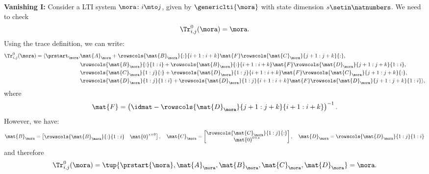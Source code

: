 {\begin{example}
\begin{equation*}
    \end{equation*}
    \textbf{Vanishing I:}
    Consider a LTI system $\mora\colon i\mto j$, given by $\genericlti{\mora}$ with state dimension $s\setin \natnumbers$.
    We need to check
    \begin{equation*}
        \Tr_{i,j}^0 (\mora)=\mora.
    \end{equation*}
    Using the trace definition, we can write:
    \begin{equation*}
        \begin{aligned}
            \Tr_{i,j}^0 (\mora)=\langle\prstart_{\mora}, & \mat{A}_\mora+\rowscols{\mat{B}_{\mora}}{:}{i+1:i+k}\mat{F}\rowscols{\mat{C}_{\mora}}{j+1:j+k}{:}, \\
                                                         & \rowscols{\mat{B}_{\mora}}{:}{1:i}+ \rowscols{\mat{B}_{\mora}}{:}{i+1:i+k}\mat{F}\rowscols{\mat{D}_{\mora}}{j+1:j+k}{1:i}, \\
                                                         & \rowscols{\mat{C}_{\mora}}{1:j}{:}+\rowscols{\mat{D}_{\mora}}{1:j}{i+1:i+k}\mat{F}\rowscols{\mat{C}_{\mora}}{j+1:j+k}{:}, \\
                                                         & \rowscols{\mat{D}_{\mora}}{1:j}{1:i}+ \rowscols{\mat{D}_{\mora}}{1:j}{i+1:i+k}\mat{F}\rowscols{\mat{D}_{\mora}}{j+1:j+k}{1:i}\rangle,
        \end{aligned}
    \end{equation*}
    where
    \begin{equation*}
        \mat{F}=\left(\idmat - \rowscols{\mat{D}_{\mora}}{j+1:j+k}{i+1:i+k}\right)^{-1}.
    \end{equation*}
    However, we have:
    \begin{equation*}
        \mat{B}_\mora=\begin{bmatrix}
            \rowscols{\mat{B}_{\mora}}{:}{1:i} & \mat{0}^{s\times 0}
        \end{bmatrix},\quad
        \mat{C}_\mora=\begin{bmatrix}
            \rowscols{\mat{C}_{\mora}}{1:j}{:} \\ \mat{0}^{0\times s}
        \end{bmatrix},
        \quad
        \mat{D}_\mora= \rowscols{\mat{D}_\mora}{1:j}{1:i}
    \end{equation*}
    and therefore
    \begin{equation*}
        \Tr_{i,j}^0 (\mora)=\tup{\prstart{\mora}, \mat{A}_\mora, \mat{B}_\mora, \mat{C}_\mora, \mat{D}_\mora}=\mora.
    \end{equation*}


\end{example}}
